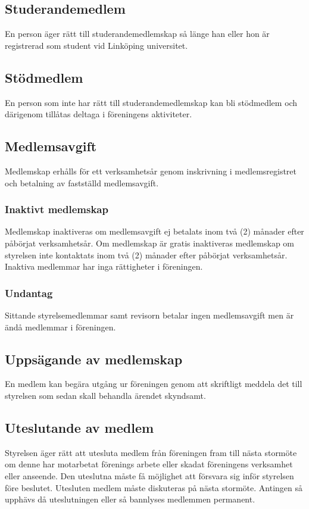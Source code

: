 \documentclass[11pt,a4paper]{article}
\begin{document}
\subsection{Studerandemedlem}
En person äger rätt till studerandemedlemskap så länge han eller hon är registrerad som student vid Linköping universitet.
\subsection{Stödmedlem}
En person som inte har rätt till studerandemedlemskap kan bli stödmedlem och därigenom tillåtas deltaga i föreningens aktiviteter.

\subsection{Medlemsavgift}
Medlemskap erhålls för ett verksamhetsår genom inskrivning i medlemsregistret och betalning av fastställd medlemsavgift.
\subsubsection{Inaktivt medlemskap}
Medlemskap inaktiveras om medlemsavgift ej betalats inom två (2) månader
efter påbörjat verksamhetsår. Om medlemskap är gratis inaktiveras medlemskap om styrelsen inte kontaktats inom två (2) månader efter påbörjat verksamhetsår. Inaktiva medlemmar har inga rättigheter i föreningen.
\subsubsection{Undantag}
Sittande styrelsemedlemmar samt revisorn betalar ingen medlemsavgift men är ändå medlemmar i föreningen.
\subsection{Uppsägande av medlemskap}
En medlem kan begära utgång ur föreningen genom att skriftligt meddela det till styrelsen som sedan skall behandla ärendet skyndsamt.
\subsection{Uteslutande av medlem}
Styrelsen äger rätt att utesluta medlem från föreningen fram till nästa
stormöte om denne har motarbetat förenings arbete eller skadat föreningens verksamhet eller anseende. Den uteslutna måste få möjlighet att försvara sig inför styrelsen före beslutet. Utesluten medlem måste diskuteras på nästa stormöte. Antingen så upphävs då uteslutningen eller så bannlyses medlemmen permanent.
\end{document}
